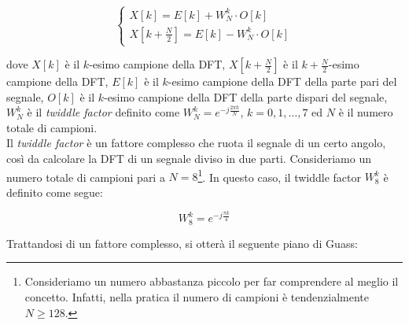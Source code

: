 \documentclass[a4paper,12pt]{report}  %
\begin{document}
\begin{equation}
    \begin{cases}
        X[k] = E[k] + W_N^k \cdot O[k] \\
        X[k + \frac{N}{2}] = E[k] - W_N^k \cdot O[k]
    \end{cases} \label{eq:butterfly}
\end{equation}

dove $X[k]$ è il $k$-esimo campione della DFT, $X[k + \frac{N}{2}]$ è il $k + \frac{N}{2}$-esimo campione della DFT, $E[k]$ è il $k$-esimo campione della DFT della parte pari del segnale, $O[k]$ è il $k$-esimo campione della DFT della parte dispari del segnale, $W_N^k$ è il \textit{twiddle factor} definito come $W_N^k = e^{-j \frac{2 \pi k}{N}}$, $k = 0, 1, \ldots, 7$ ed $N$ è il numero totale di campioni.
\noindent\\ Il \textit{twiddle factor} è un fattore complesso che ruota il segnale di un certo angolo, così da calcolare la DFT di un segnale diviso in due parti.
Consideriamo un numero totale di campioni pari a $N = 8$\footnote{Consideriamo un numero abbastanza piccolo per far comprendere al meglio il concetto. Infatti, nella pratica il numero di campioni è tendenzialmente $N \geq 128$.}.
In questo caso, il twiddle factor $W_8^k$ è definito come segue:

\begin{equation}
    W_8^k = e^{-j \frac{\pi k}{4}} \nonumber
\end{equation}

Trattandosi di un fattore complesso, si otterà il seguente piano di Guass:
\end{document}

